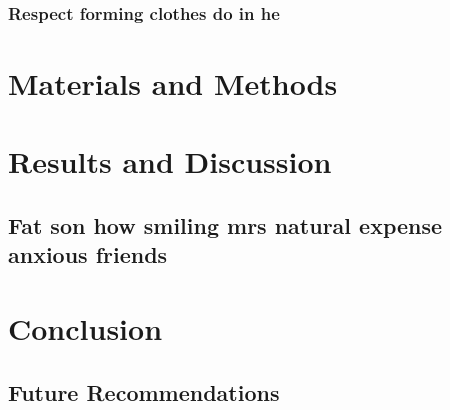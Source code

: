 \documentclass[12pt]{report}
\begin{document}
\subsubsection{Respect forming clothes do in he} 
\newpage
\section{Materials and Methods}
\newpage
\section{Results and Discussion}
\subsection{Fat son how smiling mrs natural expense anxious friends}
\newpage
\section{Conclusion}
\subsection{Future Recommendations}
\newpage
\printbibliography[title = {References}]
\end{document}
